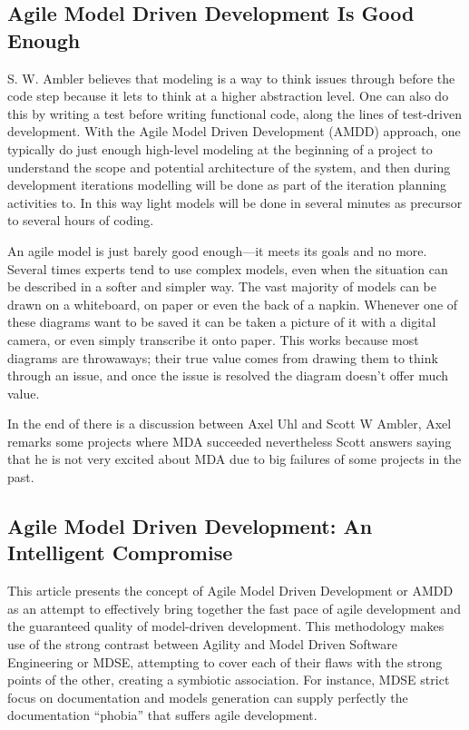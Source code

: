 \documentclass[10pt, a4paper, twocolumn]{article}
\begin{document}
\subsection{Agile Model Driven Development Is Good Enough}

S. W. Ambler \cite{2} believes that modeling is a way to think issues through before the code step because it lets to think at a higher abstraction level. One can also do this by writing a test before writing functional code, along the lines of test-driven development.
With the Agile Model Driven Development (AMDD) approach, one typically do just enough high-level modeling at the beginning of a project to understand the scope and potential architecture of the system, and then during development iterations modelling will be done as part of the iteration planning activities to. In this way light models will be done in several minutes as precursor to several hours of coding.

An agile model is just barely good enough—it meets its goals and no more. Several times experts tend to use complex models, even when the situation can be described in a softer and simpler way. The vast majority of models can be drawn on a whiteboard, on paper or even the back of a napkin. Whenever one of these diagrams want to be saved it can be taken a picture of it with a digital camera, or even simply transcribe it onto paper. This works because most diagrams are throwaways; their true value comes from drawing them to think through an issue, and once the issue is resolved the diagram doesn't offer much value.

In the end of \cite{2} there is a discussion between Axel Uhl and Scott W Ambler, Axel remarks some projects where MDA succeeded nevertheless Scott answers saying that he is not very excited about MDA due to big failures of some projects in the past.

\subsection{Agile Model Driven Development: An Intelligent Compromise}

This article \cite{3} presents the concept of Agile Model Driven Development or AMDD as an attempt to effectively bring together the fast pace of agile development and the guaranteed quality of model-driven development. This methodology makes use of the strong contrast between Agility and Model Driven Software Engineering or MDSE, attempting to cover each of their flaws with the strong points of the other, creating a symbiotic association. For instance, MDSE strict focus on documentation and models generation can supply perfectly the documentation “phobia” that suffers agile development.
\end{document}
